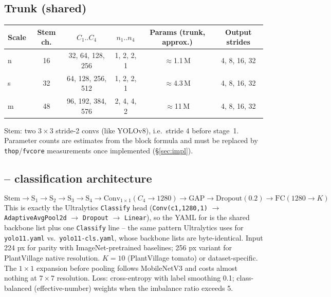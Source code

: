 \subsection{Trunk (shared)}
\begin{center}
\begin{tabular}{@{}lccccc@{}}
\toprule
Scale & Stem ch. & $C_1..C_4$ & $n_1..n_4$ & Params (trunk, approx.) & Output strides \\
\midrule
n & 16 & 32, 64, 128, 256 & 1, 2, 2, 1 & $\approx$1.1\,M & 4, 8, 16, 32 \\
s & 32 & 64, 128, 256, 512 & 1, 2, 2, 1 & $\approx$4.3\,M & 4, 8, 16, 32 \\
m & 48 & 96, 192, 384, 576 & 2, 4, 4, 2 & $\approx$11\,M & 4, 8, 16, 32 \\
\bottomrule
\end{tabular}
\end{center}
Stem: two $3\times3$ stride-2 convs (like YOLOv8), i.e.\ stride 4 before stage~1. Parameter counts are estimates from the block formula and must be replaced by \texttt{thop}/\texttt{fvcore} measurements once implemented (\S\ref{sec:impl}).

\subsection{\modelcls{} -- classification architecture}
\[
\text{Stem} \to \text{S}_1 \to \text{S}_2 \to \text{S}_3 \to \text{S}_4 \to \mathrm{Conv}_{1\times1}(C_4\!\to\!1280) \to \mathrm{GAP} \to \mathrm{Dropout}(0.2) \to \mathrm{FC}(1280\!\to\!K)
\]
This is exactly the Ultralytics \texttt{Classify} head (\texttt{Conv(c1,1280,1)} $\to$ \texttt{AdaptiveAvgPool2d} $\to$ \texttt{Dropout} $\to$ \texttt{Linear}), so the YAML for \modelcls{} is the shared backbone list plus one \texttt{Classify} line -- the same pattern Ultralytics uses for \texttt{yolo11.yaml} vs.\ \texttt{yolo11-cls.yaml}, whose backbone lists are byte-identical.
Input 224 px for parity with ImageNet-pretrained baselines; 256 px variant for PlantVillage native resolution. $K=10$ (PlantVillage tomato) or dataset-specific. The $1\times1$ expansion before pooling follows MobileNetV3 and costs almost nothing at $7\times7$ resolution. Loss: cross-entropy with label smoothing 0.1; class-balanced (effective-number) weights when the imbalance ratio exceeds 5.


